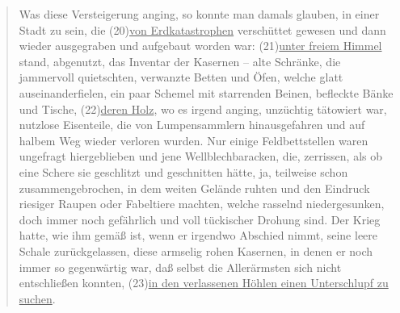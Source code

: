 \documentclass[12pt,a4paper,twoside]{article}
\newenvironment{nohyphens}{%
  \par
  \hyphenpenalty=10000
  \exhyphenpenalty=10000
  \sloppy
}{\par}
\begin{document}
\begin{nohyphens}
\begin{quote}
      Was diese Versteigerung anging, so konnte man damals glauben, in einer Stadt zu sein, die (20)\ul{von Erdkatastrophen} verschüttet gewesen und dann wieder ausgegraben und aufgebaut worden war: (21)\ul{unter freiem Himmel} stand, abgenutzt, das Inventar der Kasernen – alte Schränke, die jammervoll quietschten, verwanzte Betten und Öfen, welche glatt auseinanderfielen, ein paar Schemel mit starrenden Beinen, befleckte Bänke und Tische, (22)\ul{deren Holz}, wo es irgend anging, unzüchtig tätowiert war, nutzlose Eisenteile, die von Lumpensammlern hinausgefahren und auf halbem Weg wieder verloren wurden.
Nur einige Feldbettstellen waren ungefragt hiergeblieben und jene Wellblechbaracken, die, zerrissen, als ob eine Schere sie geschlitzt und geschnitten hätte, ja, teilweise schon zusammengebrochen, in dem weiten Gelände ruhten und den Eindruck riesiger Raupen oder Fabeltiere machten, welche rasselnd niedergesunken, doch immer noch gefährlich und voll tückischer Drohung sind.
Der Krieg hatte, wie ihm gemäß ist, wenn er irgendwo Abschied nimmt, seine leere Schale zurückgelassen, diese armselig rohen Kasernen, in denen er noch immer so gegenwärtig war, daß selbst die Allerärmsten sich nicht entschließen konnten, (23)\ul{in den verlassenen Höhlen einen Unterschlupf zu suchen}.
  \end{quote}
\end{nohyphens}
\end{document}
